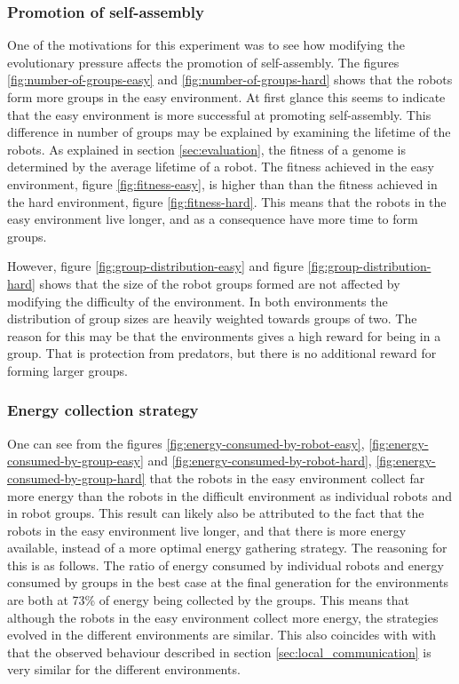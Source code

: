 \subsubsection{Promotion of self-assembly}
One of the motivations for this experiment was to see how modifying the evolutionary pressure affects the promotion of self-assembly.
The figures \ref{fig:number-of-groups-easy} and \ref{fig:number-of-groups-hard} shows that the robots form more groups in the easy environment.
At first glance this seems to indicate that the easy environment is more successful at promoting self-assembly.
This difference in number of groups may be explained by examining the lifetime of the robots.
As explained in section \ref{sec:evaluation}, the fitness of a genome is determined by the average lifetime of a robot.
The fitness achieved in the easy environment, figure \ref{fig:fitness-easy}, is higher than than the fitness achieved in the hard environment, figure \ref{fig:fitness-hard}.
This means that the robots in the easy environment live longer, and as a consequence have more time to form groups.

However, figure \ref{fig:group-distribution-easy} and figure \ref{fig:group-distribution-hard} shows that the size of the robot groups formed are not affected by modifying the difficulty of the environment.
In both environments the distribution of group sizes are heavily weighted towards groups of two.
The reason for this may be that the environments gives a high reward for being in a group.
That is protection from predators, but there is no additional reward for forming larger groups.

\subsubsection{Energy collection strategy}
One can see from the figures \ref{fig:energy-consumed-by-robot-easy}, \ref{fig:energy-consumed-by-group-easy} and \ref{fig:energy-consumed-by-robot-hard}, \ref{fig:energy-consumed-by-group-hard} that the robots in the easy environment collect far more energy than the robots in the difficult environment as individual robots and in robot groups.
This result can likely also be attributed to the fact that the robots in the easy environment live longer, and that there is more energy available, instead of a more optimal energy gathering strategy.
The reasoning for this is as follows.
The ratio of energy consumed by individual robots and energy consumed by groups in the best case at the final generation for the environments are both at 73\% of energy being collected by the groups.
This means that although the robots in the easy environment collect more energy, the strategies evolved in the different environments are similar.
This also coincides with with that the observed behaviour described in section \ref{sec:local_communication} is very similar for the different environments.

